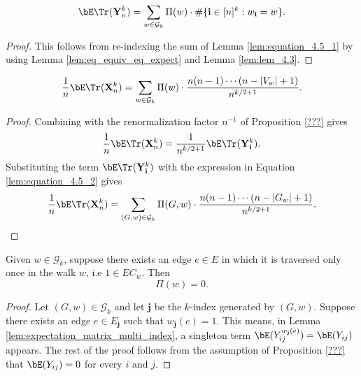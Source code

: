 \begin{lemma}
  \label{lem:equation_4.5_2}
  \[
  \bE \Tr (\mathbf{Y}_n^k) = \sum_{w \in \mathcal{G}_k} \Pi (w) \cdot \# \{ \mathbf{i} \in [n]^k : w_\mathbf{i} = w \}.
  \]
\end{lemma}

\begin{proof}
  This follows from re-indexing the sum of Lemma \ref{lem:equation_4.5_1} by using Lemma \ref{lem:eq_equiv_eq_expect} and Lemma \ref{lem:lem_4.3}.
\end{proof}


\begin{lemma}
  \label{lem:equation_4.5_3}
  \[
  \frac{1}{n} \bE \Tr (\mathbf{X}_n^k) = \sum_{w \in \mathcal{G}_k} \Pi (w) \cdot \frac{n (n-1) \cdots (n - |V_w| + 1)}{n^{k/2+1}}.
  \]
\end{lemma}

\begin{proof}
  Combining with the renormalization factor $n^{-1}$ of Proposition \ref{???} gives
  \[
  \frac{1}{n} \bE \Tr (\mathbf{X}_n^k) = \frac{1}{n^{k/2+1}} \bE \Tr (\mathbf{Y}_\mathbf{i}^k).
  \]
  Substituting the term $\bE \Tr (\mathbf{Y}_\mathbf{i}^k)$ with the expression in Equation \ref{lem:equation_4.5_2} gives
  \[
  \frac{1}{n} \bE \Tr (\mathbf{X}_n^k) = \sum_{\substack{(G,w) \in \mathcal{G}_k}} \Pi (G,w) \cdot \frac{n (n-1) \cdots (n - |G_w| + 1)}{n^{k/2+1}}.
  \]
\end{proof}


\begin{lemma}[$\Pi (G,w) = 0$ : R-1-15 : lem:Pi.prod\_eq\_zero\_if\_w\_le\_two]
  \label{lem:Pi.prod_eq_zero_if_w_le_two}
  Given $w \in \mathcal{G}_k$, suppose there exists an edge $e \in E$ in which it is traversed only
  once in the walk $w$, i.e $1 \in EC_w$. Then
  \[
  \Pi (w) = 0.
  \]
\end{lemma}

\begin{proof}
  Let $(G,w) \in \mathcal{G}_k$ and let $\mathbf{j}$ be the $k$-index generated by $(G,w)$. Suppose there exists an edge $e \in E_\mathbf{j}$ such that $w_\mathbf{j}(e) = 1$.
  This means, in Lemma \ref{lem:expectation_matrix_multi_index}, a singleton term $\bE (Y_{ij}^{w_\mathbf{j}(e)}) = \bE (Y_{ij})$ appears.
  The rest of the proof follows from the assumption of Proposition \ref{???} that $\bE (Y_{ij}) = 0$ for every $i$ and $j$.
\end{proof}


